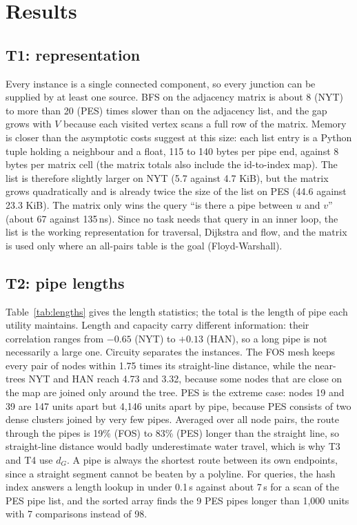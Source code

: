 \section{Results}\label{sec:results}

\subsection{T1: representation}
Every instance is a single connected component, so every junction can be supplied by at least one source. BFS on the adjacency matrix is about 8 (NYT) to more than 20 (PES) times slower than on the adjacency list, and the gap grows with $V$ because each visited vertex scans a full row of the matrix. Memory is closer than the asymptotic costs suggest at this size: each list entry is a Python tuple holding a neighbour and a float, 115 to 140 bytes per pipe end, against 8 bytes per matrix cell (the matrix totals also include the id-to-index map). The list is therefore slightly larger on NYT (5.7 against 4.7 KiB), but the matrix grows quadratically and is already twice the size of the list on PES (44.6 against 23.3 KiB). The matrix only wins the query ``is there a pipe between $u$ and $v$'' (about 67 against 135\,ns). Since no task needs that query in an inner loop, the list is the working representation for traversal, Dijkstra and flow, and the matrix is used only where an all-pairs table is the goal (Floyd-Warshall).

\subsection{T2: pipe lengths}
Table~\ref{tab:lengths} gives the length statistics; the total is the length of pipe each utility maintains. Length and capacity carry different information: their correlation ranges from $-0.65$ (NYT) to $+0.13$ (HAN), so a long pipe is not necessarily a large one. Circuity separates the instances. The FOS mesh keeps every pair of nodes within 1.75 times its straight-line distance, while the near-trees NYT and HAN reach 4.73 and 3.32, because some nodes that are close on the map are joined only around the tree. PES is the extreme case: nodes 19 and 39 are 147 units apart but 4,146 units apart by pipe, because PES consists of two dense clusters joined by very few pipes. Averaged over all node pairs, the route through the pipes is 19\% (FOS) to 83\% (PES) longer than the straight line, so straight-line distance would badly underestimate water travel, which is why T3 and T4 use $d_G$. A pipe is always the shortest route between its own endpoints, since a straight segment cannot be beaten by a polyline. For queries, the hash index answers a length lookup in under 0.1\,\textmu s against about 7\,\textmu s for a scan of the PES pipe list, and the sorted array finds the 9 PES pipes longer than 1,000 units with 7 comparisons instead of 98.

